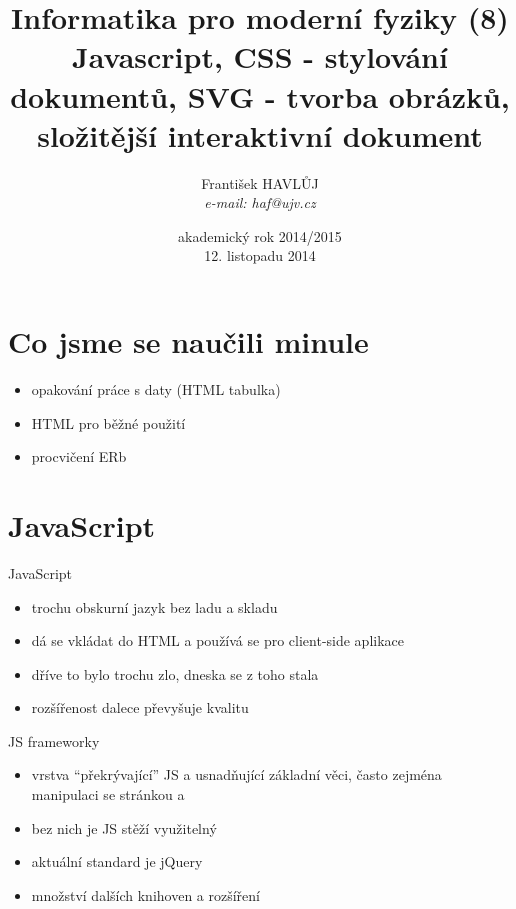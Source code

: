 \documentclass{beamer}
\title[IMF (8)]{Informatika pro moderní fyziky (8)\\ Javascript, CSS - stylování dokumentů, SVG - tvorba obrázků, složitější interaktivní dokument}
\author[Franti\v{s}ek HAVL\r{U}J, ORF ÚJV Řež]{Franti\v{s}ek HAVL\r{U}J\\{\scriptsize \emph{e-mail: haf@ujv.cz}}}
\date{akademický rok 2014/2015\\12. listopadu 2014}
\institute[ORF ÚJV Řež]
{ÚJV Řež\\oddělení Reaktorové fyziky a podpory palivového cyklu}
\begin{document}
\begin{frame}
  \titlepage
\end{frame}

\begin{frame}
  \tableofcontents
\end{frame}

\section{Co jsme se naučili minule}

\begin{frame}{}
  \begin{itemize}
    \item opakování práce s daty (HTML tabulka)
    \item HTML pro běžné použití
    \item procvičení ERb
  \end{itemize}
\end{frame}


\section{JavaScript}

\begin{frame}{JavaScript}
  \begin{itemize}
    \item trochu obskurní jazyk bez ladu a skladu
    \item dá se vkládat do HTML a používá se pro client-side aplikace
    \item dříve to bylo trochu zlo, dneska se z toho stala
    \item rozšířenost dalece převyšuje kvalitu
  \end{itemize}
\end{frame}

\begin{frame}{JS frameworky}
  \begin{itemize}
    \item vrstva ``překrývající'' JS a usnadňující základní věci, často zejména manipulaci se stránkou a
    \item bez nich je JS stěží využitelný
    \item aktuální standard je jQuery
    \item množství dalších knihoven a rozšíření
  \end{itemize}
\end{frame}
\end{document}
